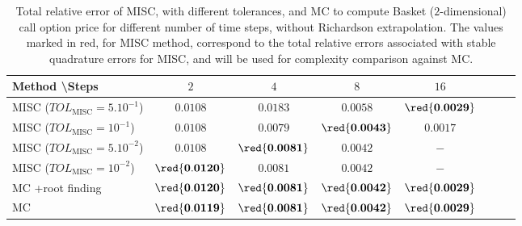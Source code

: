 \begin{table}[h!]
	\centering
	\begin{tabular}{l*{6}{c}r}
		Method \textbackslash  Steps            & $2$ & $4$ & $8$ & $16$  \\
		\hline
		MISC ($TOL_{\text{MISC}}=5.10^{-1}$) &$\mathbf{0.0108}$ & $\mathbf{0.0183}$ & $\mathbf{0.0058}$ & $\mathbf{\red{0.0029}}$  \\	
		MISC ($TOL_{\text{MISC}}=10^{-1}$) & $\mathbf{0.0108}$ & $\mathbf{0.0079}$ & $\mathbf{\red{0.0043}}$ & $\mathbf{0.0017}$  \\	
		MISC ($TOL_{\text{MISC}}=5.10^{-2}$) & $\mathbf{0.0108}$ & $\mathbf{\red{0.0081}}$ & $\mathbf{0.0042}$ & $\mathbf{-}$  \\	
		MISC ($TOL_{\text{MISC}}=10^{-2}$)& $\mathbf{\red{0.0120}}$ & $\mathbf{0.0081}$ &$\mathbf{0.0042}$ & $\mathbf{-}$  \\	
		\hline	
		MC +root finding  & $\mathbf{\red{0.0120}}$ & $\mathbf{\red{0.0081}}$ & $\mathbf{\red{0.0042}}$ & $\mathbf{\red{0.0029}}$\\
		MC   &  $\mathbf{\red{0.0119}}$ & $\mathbf{\red{0.0081}}$ & $\mathbf{\red{0.0042}}$ & $\mathbf{\red{0.0029}}$  \\	
		\hline
	\end{tabular}
	\caption{Total relative  error of MISC, with different tolerances, and MC to compute Basket ($2$-dimensional) call option price  for different number of time steps, without Richardson extrapolation.  The values marked in red, for MISC method, correspond to the total relative errors associated with  stable quadrature errors for MISC, and will be used for complexity comparison against MC.}
	\label{Total error of MISC and MC to compute Basket 2dCall option price of the different tolerances for different number of time steps, without Richardson extrapolation. The numbers between parentheses are the corresponding absolute errors,beta_16}
\end{table}

\FloatBarrier

